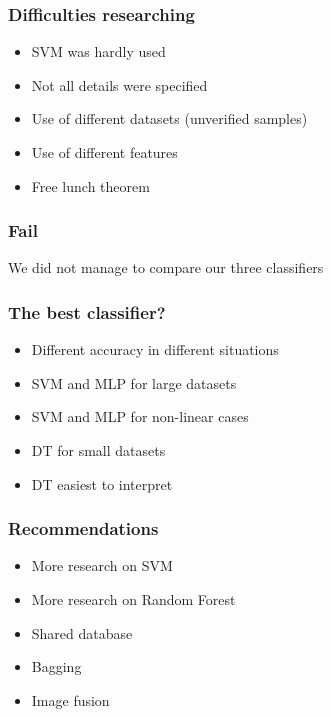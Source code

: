 \documentclass{beamer}
\begin{document}

\begin{frame}
\frametitle{Difficulties researching}
\begin{itemize}
	\item SVM was hardly used
	\item Not all details were specified
	\item Use of different datasets (unverified samples)
	\item Use of different features
	\item Free lunch theorem	 

\end{itemize}
\end{frame}


\begin{frame}
\frametitle{Fail}

\centerline{We did not manage to compare our three classifiers}

\end{frame}


\begin{frame}
\frametitle{The best classifier?}
\begin{itemize}
	\item Different accuracy in different situations
	\item SVM and MLP for large datasets
	\item SVM and MLP for non-linear cases
	\item DT for small datasets
	\item DT easiest to interpret
	
\end{itemize}
\end{frame}

\begin{frame}
\frametitle{Recommendations}
\begin{itemize}
	\item More research on SVM
	\item More research on Random Forest
	\item Shared database
	\item Bagging
	\item Image fusion

\end{itemize}
\end{frame}
\end{document}
